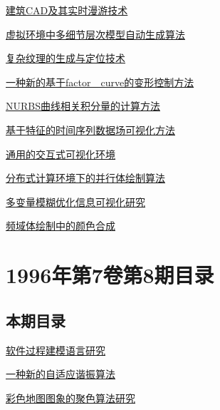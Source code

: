 \documentclass[a4paper]{article}
\begin{document}
\href{http://www.jos.org.cn/ch/reader/download_pdf.aspx?file_no=19960902&year_id=1996&quarter_id=9&falg=1}{建筑CAD及其实时漫游技术}

\href{http://www.jos.org.cn/ch/reader/download_pdf.aspx?file_no=19960903&year_id=1996&quarter_id=9&falg=1}{虚拟环境中多细节层次模型自动生成算法}

\href{http://www.jos.org.cn/ch/reader/download_pdf.aspx?file_no=19960904&year_id=1996&quarter_id=9&falg=1}{复杂纹理的生成与定位技术}

\href{http://www.jos.org.cn/ch/reader/download_pdf.aspx?file_no=19960905&year_id=1996&quarter_id=9&falg=1}{一种新的基于factor　curve的变形控制方法}

\href{http://www.jos.org.cn/ch/reader/download_pdf.aspx?file_no=19960906&year_id=1996&quarter_id=9&falg=1}{NURBS曲线相关积分量的计算方法}

\href{http://www.jos.org.cn/ch/reader/download_pdf.aspx?file_no=19960907&year_id=1996&quarter_id=9&falg=1}{基于特征的时间序列数据场可视化方法}

\href{http://www.jos.org.cn/ch/reader/download_pdf.aspx?file_no=19960908&year_id=1996&quarter_id=9&falg=1}{通用的交互式可视化环境}

\href{http://www.jos.org.cn/ch/reader/download_pdf.aspx?file_no=19960909&year_id=1996&quarter_id=9&falg=1}{分布式计算环境下的并行体绘制算法}

\href{http://www.jos.org.cn/ch/reader/download_pdf.aspx?file_no=19960910&year_id=1996&quarter_id=9&falg=1}{多变量模糊优化信息可视化研究}

\href{http://www.jos.org.cn/ch/reader/download_pdf.aspx?file_no=19960911&year_id=1996&quarter_id=9&falg=1}{频域体绘制中的颜色合成}


\section{\textbf{1996年第7卷第8期目录}}
\subsection{本期目录}
\href{http://www.jos.org.cn/ch/reader/download_pdf.aspx?file_no=19960801&year_id=1996&quarter_id=8&falg=1}{软件过程建模语言研究}

\href{http://www.jos.org.cn/ch/reader/download_pdf.aspx?file_no=19960802&year_id=1996&quarter_id=8&falg=1}{一种新的自适应谐振算法}

\href{http://www.jos.org.cn/ch/reader/download_pdf.aspx?file_no=19960803&year_id=1996&quarter_id=8&falg=1}{彩色地图图象的聚色算法研究}
\end{document}
